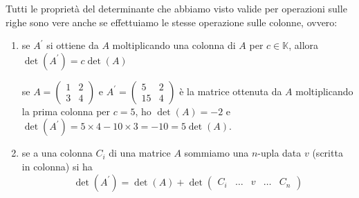 \begin{teorema}
  \begin{osservazione}
    Tutti le proprietà del determinante che abbiamo visto valide per operazioni sulle righe sono
    vere anche se effettuiamo le stesse operazione sulle colonne, ovvero:
    \begin{enumerate}
    \item se $A^\prime$ si ottiene da $A$ moltiplicando una colonna di $A$ per $c\in \mathds{K}$,
      allora $\det(A^\prime)=c\det(A)$
      \begin{esempio}
        se $A=
        \begin{pmatrix}
          1 & 2\\
          3 & 4
        \end{pmatrix}
        $ e $A^\prime=
        \begin{pmatrix}
          5 & 2\\
          15 & 4
        \end{pmatrix}
        $ è la matrice ottenuta da $A$ moltiplicando la prima colonna per $c = 5$, ho $\det(A)=-2$
        e $\det(A^\prime)=5\times4-10\times3=-10=5\det(A)$.
      \end{esempio}
    \item se a una colonna $C_i$ di una matrice $A$ sommiamo una $n$-upla data $v$ (scritta in
      colonna) si ha
      \begin{equation*}
        \det(A^\prime)=\det(A)+\det
        \begin{pmatrix}
          C_i & \dots & v & \dots & C_n
        \end{pmatrix}
      \end{equation*}
\end{enumerate}
\end{osservazione}
\end{teorema}
